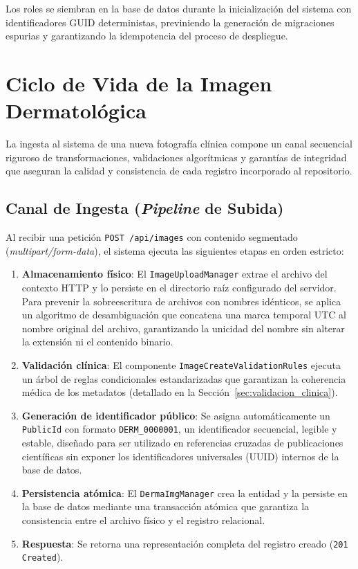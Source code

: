 Los roles se siembran en la base de datos durante la inicialización del sistema con identificadores GUID 
deterministas, previniendo la generación de migraciones espurias y garantizando la idempotencia del 
proceso de despliegue.

\section{Ciclo de Vida de la Imagen Dermatológica}
La ingesta al sistema de una nueva fotografía clínica compone un canal secuencial riguroso de 
transformaciones, validaciones algorítmicas y garantías de integridad que aseguran la calidad y 
consistencia de cada registro incorporado al repositorio.

\subsection{Canal de Ingesta (\textit{Pipeline} de Subida)}
Al recibir una petición \texttt{POST /api/images} con contenido segmentado (\textit{multipart/form-data}), 
el sistema ejecuta las siguientes etapas en orden estricto:

\begin{enumerate}
    \item \textbf{Almacenamiento físico}: El \texttt{ImageUploadManager} extrae el archivo del contexto 
    HTTP y lo persiste en el directorio raíz configurado del servidor. Para prevenir la sobreescritura de 
    archivos con nombres idénticos, se aplica un algoritmo de desambiguación que concatena una marca 
    temporal UTC al nombre original del archivo, garantizando la unicidad del nombre sin alterar la 
    extensión ni el contenido binario.
    \item \textbf{Validación clínica}: El componente \texttt{ImageCreateValidationRules} ejecuta un árbol 
    de reglas condicionales estandarizadas que garantizan la coherencia médica de los metadatos 
    (detallado en la Sección~\ref{sec:validacion_clinica}).
    \item \textbf{Generación de identificador público}: Se asigna automáticamente un \texttt{PublicId} 
    con formato \texttt{DERM\_0000001}, un identificador secuencial, legible y estable, diseñado para 
    ser utilizado en referencias cruzadas de publicaciones científicas sin exponer los identificadores 
    universales (UUID) internos de la base de datos.
    \item \textbf{Persistencia atómica}: El \texttt{DermaImgManager} crea la entidad y la persiste en la 
    base de datos mediante una transacción atómica que garantiza la consistencia entre el archivo físico 
    y el registro relacional.
    \item \textbf{Respuesta}: Se retorna una representación completa del registro creado 
    (\texttt{201 Created}).
\end{enumerate}

